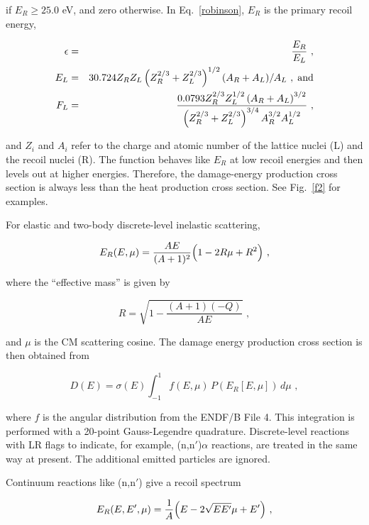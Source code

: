 \noindent
if $E_R\ge 25.0$ eV, and zero otherwise.  In Eq.~\ref{robinson},
$E_R$ is the primary recoil energy,

\begin{eqnarray}
   \epsilon&=&\frac{E_R}{E_L}\,\,,\\
   E_L&=&30.724Z_RZ_L\left(Z_R^{2/3}+Z_L^{2/3}\right)^{1/2}
     (A_R+A_L)/A_L\,\,,\;\hbox{and}\\
   F_L&=&\frac{0.0793Z_R^{2/3}Z_L^{1/2}\left(A_R+A_L\right)^{3/2}}
      {\left(Z_R^{2/3}+Z_L^{2/3}\right)^{3/4}A_R^{3/2}A_L^{1/2}}\,\,,
\end{eqnarray}

\noindent
and $Z_i$ and $A_i$ refer to the charge and atomic number
of the lattice nuclei (L) and the recoil nuclei (R).  The
function behaves like $E_R$ at low recoil energies and then
levels out at higher energies.  Therefore, the damage-energy
production cross section is always less than the heat
production cross section.  See Fig.~\ref{f2} for examples.

For elastic and two-body discrete-level inelastic scattering,

\begin{equation}
   E_R(E,\mu)=\frac{AE}{(A+1)^2}\Bigl(1-2R\mu+R^2\Bigr)\,\,,
\label{tworec}
\end{equation}
\vspace{0.5 pt}

\noindent
where the ``effective mass'' is given by

\begin{equation}
   R=\sqrt{1-\frac{(A+1)(-Q)}{AE}}\,\,,
\end{equation}

\noindent
and $\mu$ is the CM scattering cosine.  The damage energy
production cross section is then obtained from

\begin{equation}
   D(E)=\sigma(E)\int_{-1}^1 f(E,\mu)\,
     P(E_R[E,\mu])\,d\mu\,\,,
\label{damint}
\end{equation}

\noindent
where $f$ is the angular distribution from the ENDF/B File 4.
This integration is performed with a 20-point Gauss-Legendre
quadrature.  Discrete-level reactions with LR flags to
indicate, for example, (n,n$'$)$\alpha$ reactions, are
treated in the same way at present.  The additional emitted
particles are ignored.

Continuum reactions like (n,n$'$) give a recoil spectrum

\begin{equation}
   E_R(E,E',\mu)=\frac{1}{A}\Bigl(E-2\sqrt{EE'}\mu+E'\Bigr)\,\,,
\end{equation}

